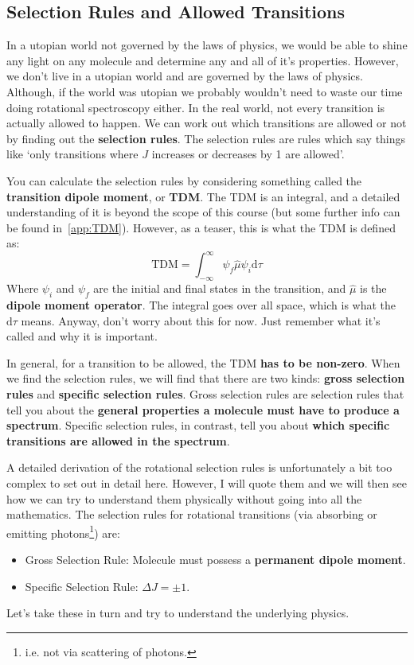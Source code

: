 \documentclass{memoir}[11pt,oneside,a4paper,openany]
\begin{document}
\subsection{Selection Rules and Allowed Transitions}
In a utopian world not governed by the laws of physics, we would be able to shine any light on any molecule and determine any and all of it's properties. However, we don't live in a utopian world and are governed by the laws of physics. Although, if the world was utopian we probably wouldn't need to waste our time doing rotational spectroscopy either. In the real world, not every transition is actually allowed to happen. We can work out which transitions are allowed or not by finding out the \textbf{selection rules}. The selection rules are rules which say things like `only transitions where $J$ increases or decreases by 1 are allowed'.

You can calculate the selection rules by considering something called the \textbf{transition dipole moment}, or \textbf{TDM}. The TDM is an integral, and a detailed understanding of it is beyond the scope of this course (but some further info can be found in~\autoref{app:TDM}). However, as a teaser, this is what the TDM is defined as:
\begin{equation}
	\text{TDM} = \int_{-\infty}^{\infty} \psi_{f}\hat{\mu}\psi_{i} \mathrm{d}\tau
\end{equation}
Where $\psi_i$ and $\psi_f$ are the initial and final states in the transition, and $\hat{\mu}$ is the \textbf{dipole moment operator}. The integral goes over all space, which is what the $\mathrm{d}\tau$ means. Anyway, don't worry about this for now. Just remember what it's called and why it is important.

In general, for a transition to be allowed, the TDM \textbf{has to be non-zero}. When we find the selection rules, we will find that there are two kinds: \textbf{gross selection rules} and \textbf{specific selection rules}. Gross selection rules are selection rules that tell you about the \textbf{general properties a molecule must have to produce a spectrum}. Specific selection rules, in contrast, tell you about \textbf{which specific transitions are allowed in the spectrum}. 

A detailed derivation of the rotational selection rules is unfortunately a bit too complex to set out in detail here. However, I will quote them and we will then see how we can try to understand them physically without going into all the mathematics. The selection rules for rotational transitions (via absorbing or emitting photons\footnote{i.e. not via scattering of photons.}) are: 
\begin{itemize}
	\item Gross Selection Rule: Molecule must possess a \textbf{permanent dipole moment}.
	\item Specific Selection Rule: $\Delta J = \pm 1$.
\end{itemize}
Let's take these in turn and try to understand the underlying physics. 
\end{document}
